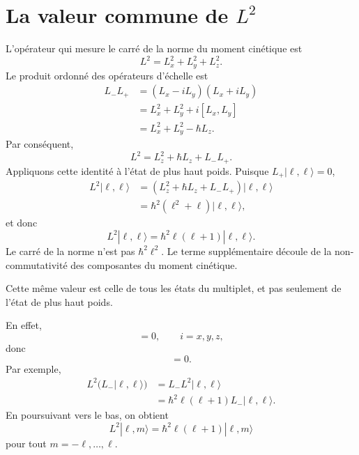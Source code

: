 \section{La valeur commune de \texorpdfstring{\(L^2\)}{L au carré}}

L’opérateur qui mesure le carré de la norme du moment cinétique est
\begin{equation}
L^2=L_x^2+L_y^2+L_z^2.
\end{equation}
Le produit ordonné des opérateurs d’échelle est
\begin{align}
L_-L_+
&=(L_x-iL_y)(L_x+iL_y) \\
&=L_x^2+L_y^2+i[L_x,L_y] \\
&=L_x^2+L_y^2-\hbar L_z.
\end{align}
Par conséquent,
\begin{equation}
L^2=L_z^2+\hbar L_z+L_-L_+.
\end{equation}
Appliquons cette identité à l’état de plus haut poids. Puisque \(L_+|\ell,\ell\rangle=0\),
\begin{align}
L^2|\ell,\ell\rangle
&=\left(L_z^2+\hbar L_z+L_-L_+\right)|\ell,\ell\rangle \\
&=\hbar^2\left(\ell^2+\ell\right)|\ell,\ell\rangle,
\end{align}
et donc
\begin{equation}
L^2|\ell,\ell\rangle
=\hbar^2\ell(\ell+1)|\ell,\ell\rangle.
\end{equation}
Le carré de la norme n’est pas \(\hbar^2\ell^2\). Le terme supplémentaire découle de la non-commutativité des composantes du moment cinétique.

Cette même valeur est celle de tous les états du multiplet, et pas seulement de l’état de plus haut poids.

\begin{classroomqa}\end{classroomqa}

En effet,
\begin{equation}
[L^2,L_i]=0,
\qquad i=x,y,z,
\end{equation}
donc
\begin{equation}
[L^2,L_\pm]=0.
\end{equation}
Par exemple,
\begin{align}
L^2\bigl(L_-|\ell,\ell\rangle\bigr)
&=L_-L^2|\ell,\ell\rangle \\
&=\hbar^2\ell(\ell+1)L_-|\ell,\ell\rangle.
\end{align}
En poursuivant vers le bas, on obtient
\begin{equation}
L^2|\ell,m\rangle
=\hbar^2\ell(\ell+1)|\ell,m\rangle
\end{equation}
pour tout \(m=-\ell,\ldots,\ell\).

